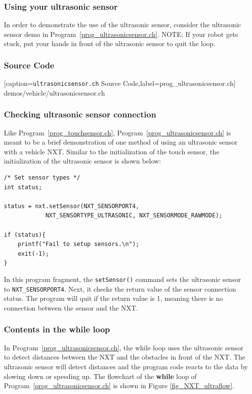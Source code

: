 \documentclass[11pt]{article}
\begin{document}
\subsubsection{Using your ultrasonic sensor \label{sec:use_ultrasonic}}
In order to demonstrate the use of the ultrasonic sensor, consider the ultrasonic sensor demo in 
Program~\ref{prog_ultrasonicsensor.ch}. NOTE: If your robot gets stuck, put your hands in 
front of the ultrasonic sensor to quit the loop.

\subsubsection*{Source Code}

[caption={{\tt ultrasonicsensor.ch} Source Code},label=prog_ultrasonicsensor.ch]
{demos/vehicle/ultrasonicsensor.ch}

\subsubsection*{Checking ultrasonic sensor connection}
Like Program~\ref{prog_touchsensor.ch}, Program~\ref{prog_ultrasonicsensor.ch} 
is meant to be a brief demonstration of one method of using an ultrasonic sensor 
with a vehicle NXT. Similar to the initialization of the touch sensor, the 
initialization of the ultrasonic sensor is shown below:
\begin{lstlisting}
/* Set sensor types */
int status;

status = nxt.setSensor(NXT_SENSORPORT4, 
            NXT_SENSORTYPE_ULTRASONIC, NXT_SENSORMODE_RAWMODE);

if (status){
    printf("Fail to setup sensors.\n");
    exit(-1);
}
\end{lstlisting}
In this program fragment, the \verb+setSensor()+ command sets the ultrasonic sensor to \verb+NXT_SENSORPORT4+.
Next, it checks the return value of the sensor connection status. The program will quit if the return value 
is 1, meaning there is no connection between the sensor and the NXT.

\subsubsection*{Contents in the while loop}
In Program~\ref{prog_ultrasonicsensor.ch}, the while loop uses the ultrasonic sensor to detect distances 
between the NXT and the obstacles in front of the NXT. The ultrasonic sensor will detect distances and the 
program code reacts to the data by slowing down or speeding up. The flowchart of the {\bf while} loop of 
Program~\ref{prog_ultrasonicsensor.ch} is shown in Figure \ref{fig_NXT_ultraflow}.
\end{document}
